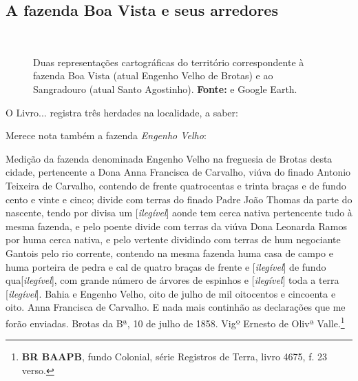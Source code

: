 \begin{citacao}
\subsection{A fazenda Boa Vista e seus arredores}

\begin{figure}[!htp]
\centering
{}
\  %
\caption{Duas representações cartográficas do território correspondente à fazenda Boa Vista (atual Engenho Velho de Brotas) e ao Sangradouro (atual Santo Agostinho). \textbf{Fonte:}  e Google Earth.}
\end{figure}

O Livro... registra três herdades na localidade, a saber:




Merece nota também a fazenda \textit{Engenho Velho}:

\begin{citacao}
Medição da fazenda denominada Engenho Velho na freguesia de Brotas desta cidade, pertencente a Dona Anna Francisca de Carvalho, viúva do finado Antonio Teixeira de Carvalho, contendo de frente quatrocentas e trinta braças e de fundo cento e vinte e cinco; divide com terras do finado Padre João Thomas da parte do nascente, tendo por divisa um [\textit{ilegível}] aonde tem cerca nativa pertencente tudo à mesma fazenda, e pelo poente divide com terras da viúva Dona Leonarda Ramos por huma cerca nativa, e pelo vertente dividindo com terras de hum negociante Gantois pelo rio corrente, contendo na mesma fazenda huma casa de campo e huma porteira de pedra e cal de quatro braças de frente e [\textit{ilegível}] de fundo qua[\textit{ilegível}], com grande número de árvores de espinhos e [\textit{ilegível}] toda a terra [\textit{ilegível}]. Bahia e Engenho Velho, oito de julho de mil oitocentos e cincoenta e oito. Anna Francisca de Carvalho. E nada mais continhão as declarações que me forão enviadas. Brotas da Bª, 10 de julho de 1858.
Vigº Ernesto de Olivª Valle.\footnote{\textbf{BR BAAPB}, fundo Colonial, série Registros de Terra, livro 4675, f. 23 verso.}
\end{citacao}


\end{citacao}
